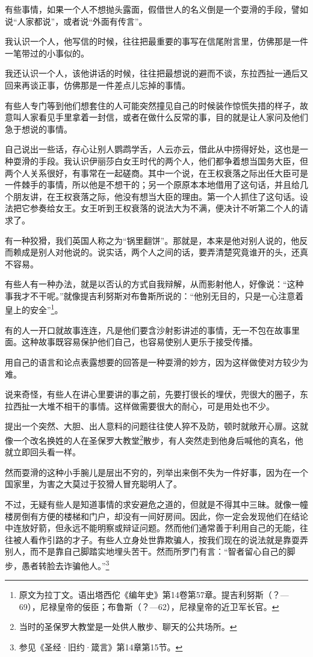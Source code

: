 \par 有些事情，如果一个人不想抛头露面，假借世人的名义倒是一个耍滑的手段，譬如说“人家都说”，或者说“外面有传言”。
\par 我认识一个人，他写信的时候，往往把最重要的事写在信尾附言里，仿佛那是一件一笔带过的小事似的。
\par 我还认识一个人，该他讲话的时候，往往把最想说的避而不谈，东拉西扯一通后又回来再谈正事，仿佛那是一件差点儿忘掉的事情。
\par 有些人专门等到他们想套住的人可能突然撞见自己的时候装作惊慌失措的样子，故意叫人家看见手里拿着一封信，或者在做什么反常的事，目的就是让人家问及他们急于想说的事情。
\par 自己说出一些话，存心让别人鹦鹉学舌，人云亦云，借此从中捞得好处，这也是一种耍滑的手段。我认识伊丽莎白女王时代的两个人，他们都争着想当国务大臣，但两个人关系很好，有事常在一起磋商。其中一个说，在王权衰落之际出任大臣可是一件棘手的事情，所以他是不想干的；另一个原原本本地借用了这句话，并且给几个朋友讲，在王权衰落之际，他没有想当大臣的理由。第一个人抓住了这句话。设法把它参奏给女王。女王听到王权衰落的说法大为不满，便决计不听第二个人的请求了。
\par 有一种狡猾，我们英国人称之为“锅里翻饼”。那就是，本来是他对别人说的，他反而赖成是别人对他说的。说实话，两个人之间的话，要弄清楚究竟谁开的头，还真不容易。
\par 有些人有一种办法，就是以否认的方式自我辩解，从而影射他人，好像说：“这种事我才不干呢。”就像提吉利努斯对布鲁斯所说的：“他别无目的，只是一心注意着皇上的安全”\footnote{原文为拉丁文。语出塔西佗《编年史》第14卷第57章。提吉利努斯（？—69），尼禄皇帝的佞臣；布鲁斯（？—62），尼禄皇帝的近卫军长官。}。
\par 有的人一开口就故事连连，凡是他们要含沙射影讲述的事情，无一不包在故事里面。这种故事既容易保护他们自己，也容易使别人更乐于接受传播。
\par 用自己的语言和论点表露想要的回答是一种耍滑的妙方，因为这样做使对方较少为难。
\par 说来奇怪，有些人在讲心里要讲的事之前，先要打很长的埋伏，兜很大的圈子，东拉西扯一大堆不相干的事情。这样做需要很大的耐心，可是用处也不少。
\par 提出一个突然、大胆、出人意料的问题往往使人猝不及防，顿时就敞开心扉。这就像一个改名换姓的人在圣保罗大教堂\footnote{当时的圣保罗大教堂是一处供人散步、聊天的公共场所。}散步，有人突然走到他身后喊他的真名，他就立即回头看一样。
\par 然而耍滑的这种小手腕儿是层出不穷的，列举出来倒不失为一件好事，因为在一个国家里，为害之大莫过于狡猾人冒充聪明人了。
\par 不过，无疑有些人是知道事情的求安避危之道的，但就是不得其中三昧。就像一幢楼房倒有方便的楼梯和门户，却没有一间好房间。因此，你一定会发现他们在结论中连放好箭，但永远不能明察或辩证问题。然而他们通常善于利用自己的无能，往往被人看作引路的才子。有些人立身处世靠欺骗人，按我们现在的说法就是靠耍弄别人，而不是靠自己脚踏实地埋头苦干。然而所罗门有言：“智者留心自己的脚步，愚者转脸去诈骗他人。”\footnote{参见《圣经·旧约·箴言》第14章第15节。}




